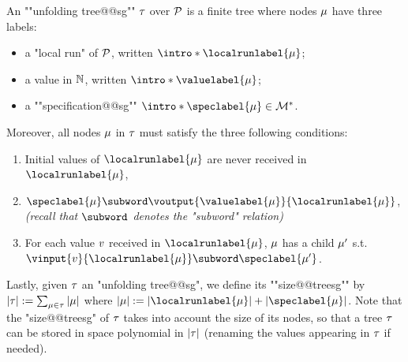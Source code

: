 \begin{definition}
\label{def:unfolding_tree_signature}
\AP An ""unfolding tree@@sg"" $\tau$ over $\mathcal{P}$ is
a finite tree where nodes $\mu$ have three labels:
\begin{itemize}
	\item a "local run" of $\mathcal{P}$, written $\intro*\localrunlabel{\node}$;
	
	\item a value in $\mathbb{N}$, written $\intro*\valuelabel{\node}$;
	
	\item a ""specification@@sg"" $\intro*\speclabel{\node} \in \messages^*$.
\end{itemize} 
Moreover, all nodes $\mu$ in $\tau$ must satisfy the three following conditions:
\begin{enumerate}[label= (\roman*), ref=(\roman*)]
	\item \label{item:condition1_initial_value_sg} Initial values of $\localrunlabel{\node}$ are never received in $\localrunlabel{\node}$, 
	\item \label{item:condition3_boss_node_sg} $\speclabel{\node} \subword \voutput{\valuelabel{\node}}{\localrunlabel{\node}}$, \emph{(recall that $\subword$ denotes the "subword" relation)}
	\item \label{item:condition2_non_initial_value_sg} For each value $v$ received in $\localrunlabel{\node}$, $\mu$ has a child $\mu'$ s.t. $\vinput{\aval}{\localrunlabel{\node}} \subword \speclabel{\node'}$.
\end{enumerate}

\AP Lastly, given $\tau$ an "unfolding tree@@sg", we define its ""size@@treesg"" by $|\tau| := \sum_{\mu \in \tau} |\mu|$ where $\size{\node} := \size{\localrunlabel{\node}} + \size{\speclabel{\node}}$. Note that the "size@@treesg" of $\tau$ takes into account the size of its nodes, so that a tree $\tau$ can be stored in space polynomial in $|\tau|$ (renaming the values appearing in $\tau$ if needed). 
\end{definition}

